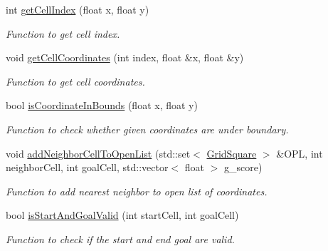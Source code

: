 \begin{DoxyCompactItemize}
int \hyperlink{classastar__plugin_1_1_a_star_planner_aae9903fa7f48e8e1ce45f4c772989e95}{get\+Cell\+Index} (float x, float y)
\begin{DoxyCompactList}\small\item\em Function to get cell index. \end{DoxyCompactList}\item 
void \hyperlink{classastar__plugin_1_1_a_star_planner_add9c03d5a079ad44e5f91ccc8344679d}{get\+Cell\+Coordinates} (int index, float \&x, float \&y)
\begin{DoxyCompactList}\small\item\em Function to get cell coordinates. \end{DoxyCompactList}\item 
bool \hyperlink{classastar__plugin_1_1_a_star_planner_a3e3717511d9000f1c55f3f57a58dfd0f}{is\+Coordinate\+In\+Bounds} (float x, float y)
\begin{DoxyCompactList}\small\item\em Function to check whether given coordinates are under boundary. \end{DoxyCompactList}\item 
void \hyperlink{classastar__plugin_1_1_a_star_planner_a2d44c51604b31cd5f7e8599520ae3645}{add\+Neighbor\+Cell\+To\+Open\+List} (std\+::set$<$ \hyperlink{class_grid_square}{Grid\+Square} $>$ \&O\+PL, int neighbor\+Cell, int goal\+Cell, std\+::vector$<$ float $>$ g\+\_\+score)
\begin{DoxyCompactList}\small\item\em Function to add nearest neighbor to open list of coordinates. \end{DoxyCompactList}\item 
bool \hyperlink{classastar__plugin_1_1_a_star_planner_a755e2c8b550458a1c4640a86fca1d993}{is\+Start\+And\+Goal\+Valid} (int start\+Cell, int goal\+Cell)
\begin{DoxyCompactList}\small\item\em Function to check if the start and end goal are valid. \end{DoxyCompactList}\end{DoxyCompactItemize}
